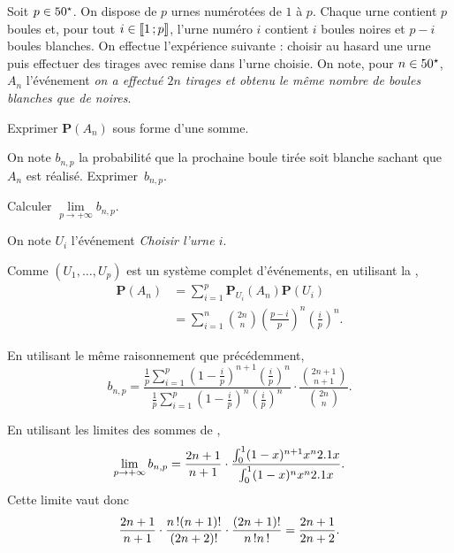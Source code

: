 \begin{exercice}
Soit $p \in 50^\star$. On dispose de $p$ urnes numérotées de $1$ à $p$. Chaque urne contient $p$ boules et, pour tout $i \in \llbracket 1\,; p \rrbracket$, l'urne numéro $i$ contient $i$ boules noires et $p - i$ boules blanches. On effectue l'expérience suivante : choisir au hasard une urne puis effectuer des tirages avec remise dans l'urne choisie. On note, pour $n \in 50^\star$, $A_n$ l'événement \textit{on a effectué $2 n$ tirages et obtenu le même nombre de boules blanches que de noires}.

\begin{questions}
\item Exprimer $\mathbf{P}(A_n)$ sous forme d'une somme.

\item On note $b_{n,p}$ la probabilité que la prochaine boule tirée soit blanche sachant que $A_n$ est réalisé. Exprimer~$b_{n,p}$.
\item Calculer $\lim\limits_{p\to+\infty} b_{n,p}$.
\end{questions}
\end{exercice}

\begin{solution}
On note $U_i$ l'événement \textit{Choisir l'urne $i$}.
\begin{reponses}
\item Comme $(U_1,\ldots,U_p)$ est un système complet d'événements, en utilisant la ,
\begin{align*}
\mathbf{P}(A_n) &= \sum_{i=1}^p \mathbf{P}_{U_i}(A_n) \mathbf{P}(U_i) \\
&= \sum_{i=1}^n \binom{2n}{n} \left(\frac{p-i}{p}\right)^n \left(\frac{i}{p}\right)^n.
\end{align*}

\item En utilisant le même raisonnement que précédemment,
\[
b_{n,p}
= \frac{\frac{1}{p} \sum\limits_{i=1}^p \left(1 - \frac{i}{p}\right)^{n+1} \left(\frac{i}{p}\right)^n}{\frac{1}{p} \sum\limits_{i=1}^p \left(1 - \frac{i}{p}\right)^{n} \left(\frac{i}{p}\right)^n} \cdot \frac{\binom{2n+1}{n+1}}{\binom{2n}{n}}.
\]

\item En utilisant les limites des sommes de ,
\[
\lim\limits_{p\to+\infty} b_{n,p} = \frac{2n+1}{n+1} \cdot \frac{\int_0^1 (1 - x)^{n+1} x^n 2.1 x}{\int_0^1 (1 - x)^n x^n 2.1 x}.
\]
Cette limite vaut donc
\[
\frac{2n+1}{n+1} \cdot \frac{n\,! (n+1)!}{(2n+2)!} \cdot \frac{(2n+1)!}{n\,! n\,!}  = \frac{2n+1}{2n+2}.
\]
\end{reponses}
\end{solution}

